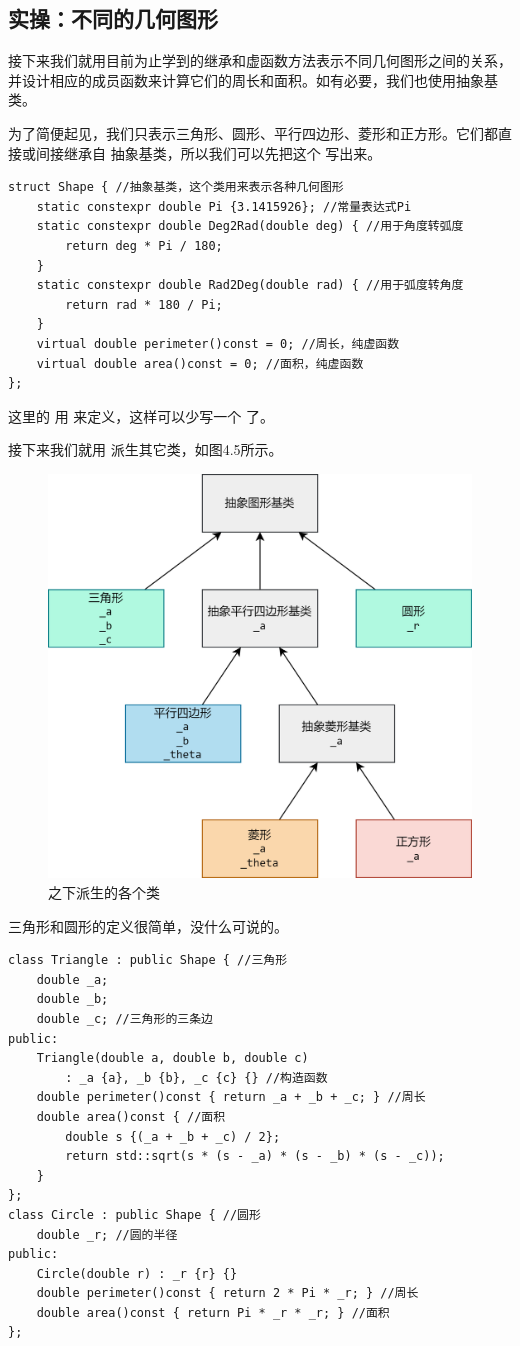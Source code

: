 \subsection*{实操：不同的几何图形}
接下来我们就用目前为止学到的继承和虚函数方法表示不同几何图形之间的关系，并设计相应的成员函数来计算它们的周长和面积。如有必要，我们也使用抽象基类。\par
为了简便起见，我们只表示三角形、圆形、平行四边形、菱形和正方形。它们都直接或间接继承自 \lstinline@Shape@ 抽象基类，所以我们可以先把这个 \lstinline@Shape@ 写出来。
\begin{lstlisting}
struct Shape { //抽象基类，这个类用来表示各种几何图形
    static constexpr double Pi {3.1415926}; //常量表达式Pi
    static constexpr double Deg2Rad(double deg) { //用于角度转弧度
        return deg * Pi / 180;
    }
    static constexpr double Rad2Deg(double rad) { //用于弧度转角度
        return rad * 180 / Pi;
    }
    virtual double perimeter()const = 0; //周长，纯虚函数
    virtual double area()const = 0; //面积，纯虚函数
};
\end{lstlisting}
这里的 \lstinline@Shape@ 用 \lstinline@struct@ 来定义，这样可以少写一个 \lstinline@public@ 了。\par
接下来我们就用 \lstinline@Shape@ 派生其它类，如图4.5所示。\par
\begin{figure}[htbp]
    \centering
    \includegraphics[width=.6\textwidth]{../images/generalized_parts/10_abstract_shape_class.drawio.png}
    \caption{\lstinline@Shape@ 之下派生的各个类}
\end{figure}
三角形和圆形的定义很简单，没什么可说的。
\begin{lstlisting}
class Triangle : public Shape { //三角形
    double _a;
    double _b;
    double _c; //三角形的三条边
public:
    Triangle(double a, double b, double c)
        : _a {a}, _b {b}, _c {c} {} //构造函数
    double perimeter()const { return _a + _b + _c; } //周长
    double area()const { //面积
        double s {(_a + _b + _c) / 2};
        return std::sqrt(s * (s - _a) * (s - _b) * (s - _c));
    }
};
class Circle : public Shape { //圆形
    double _r; //圆的半径
public:
    Circle(double r) : _r {r} {}
    double perimeter()const { return 2 * Pi * _r; } //周长
    double area()const { return Pi * _r * _r; } //面积
};
\end{lstlisting}
